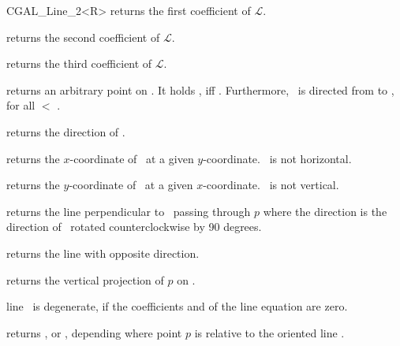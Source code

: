 \begin{ccClassTemplate} {CGAL_Line_2<R>}
       {returns the first coefficient of ${\mathcal L}$.}

       {returns the second coefficient of ${\mathcal L}$.}

       {returns the third coefficient of ${\mathcal L}$.}

       {returns an arbitrary point on \ccVar. It holds 
        , iff .
        Furthermore, \ccVar\ is directed from 
        to , for all  $<$ .}

       {returns the direction of \ccVar.}

       {returns the $x$-coordinate of \ccVar\ at a given $y$-coordinate.
        \ccPrecond \ccVar\ is not horizontal.}

       {returns the $y$-coordinate of \ccVar\ at a given $x$-coordinate.
        \ccPrecond \ccVar\ is not vertical.}

        {returns the line perpendicular to \ccVar\ passing through $p$ where the
         direction is the direction of \ccVar\ rotated counterclockwise by
         90 degrees.}

       {returns the line with opposite direction.}

       {returns the vertical projection of $p$ on \ccVar.}

       {line \ccVar\ is degenerate, if the coefficients  and 
         of the line equation are zero.}

       {}

       {}

       {returns , 
         or ,
        depending where point $p$ is relative to the oriented line \ccVar.
        }



\end{ccClassTemplate}
